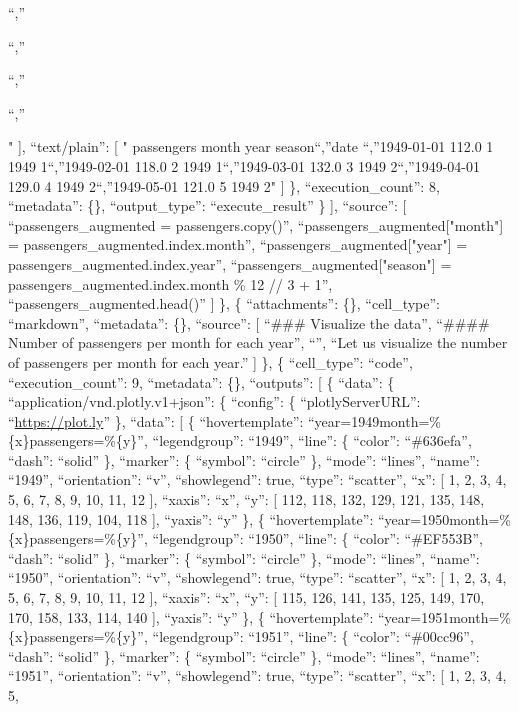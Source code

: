 \documentclass[
]{article}
\begin{document}
\n``,''

\n``,''

\n``,''

\n``,''

" {]}, ``text/plain'': {[} " passengers month year season\n``,''date
\n``,''1949-01-01 112.0 1 1949 1\n``,''1949-02-01 118.0 2 1949
1\n``,''1949-03-01 132.0 3 1949 2\n``,''1949-04-01 129.0 4 1949
2\n``,''1949-05-01 121.0 5 1949 2" {]} \}, ``execution\_count'': 8,
``metadata'': \{\}, ``output\_type'': ``execute\_result'' \} {]},
``source'': {[} ``passengers\_augmented = passengers.copy()\n'',
``passengers\_augmented{[}"month"{]} =
passengers\_augmented.index.month\n'',
``passengers\_augmented{[}"year"{]} =
passengers\_augmented.index.year\n'',
``passengers\_augmented{[}"season"{]} =
passengers\_augmented.index.month \% 12 // 3 + 1\n'',
``passengers\_augmented.head()'' {]} \}, \{ ``attachments'': \{\},
``cell\_type'': ``markdown'', ``metadata'': \{\}, ``source'': {[}
``\#\#\# Visualize the data\n'', ``\#\#\#\# Number of passengers per
month for each year\n'', ``\n'', ``Let us visualize the number of
passengers per month for each year.'' {]} \}, \{ ``cell\_type'':
``code'', ``execution\_count'': 9, ``metadata'': \{\}, ``outputs'': {[}
\{ ``data'': \{ ``application/vnd.plotly.v1+json'': \{ ``config'': \{
``plotlyServerURL'': ``\url{https://plot.ly}'' \}, ``data'': {[} \{
``hovertemplate'': ``year=1949month=\%\{x\}passengers=\%\{y\}'',
``legendgroup'': ``1949'', ``line'': \{ ``color'': ``\#636efa'',
``dash'': ``solid'' \}, ``marker'': \{ ``symbol'': ``circle'' \},
``mode'': ``lines'', ``name'': ``1949'', ``orientation'': ``v'',
``showlegend'': true, ``type'': ``scatter'', ``x'': {[} 1, 2, 3, 4, 5,
6, 7, 8, 9, 10, 11, 12 {]}, ``xaxis'': ``x'', ``y'': {[} 112, 118, 132,
129, 121, 135, 148, 148, 136, 119, 104, 118 {]}, ``yaxis'': ``y'' \}, \{
``hovertemplate'': ``year=1950month=\%\{x\}passengers=\%\{y\}'',
``legendgroup'': ``1950'', ``line'': \{ ``color'': ``\#EF553B'',
``dash'': ``solid'' \}, ``marker'': \{ ``symbol'': ``circle'' \},
``mode'': ``lines'', ``name'': ``1950'', ``orientation'': ``v'',
``showlegend'': true, ``type'': ``scatter'', ``x'': {[} 1, 2, 3, 4, 5,
6, 7, 8, 9, 10, 11, 12 {]}, ``xaxis'': ``x'', ``y'': {[} 115, 126, 141,
135, 125, 149, 170, 170, 158, 133, 114, 140 {]}, ``yaxis'': ``y'' \}, \{
``hovertemplate'': ``year=1951month=\%\{x\}passengers=\%\{y\}'',
``legendgroup'': ``1951'', ``line'': \{ ``color'': ``\#00cc96'',
``dash'': ``solid'' \}, ``marker'': \{ ``symbol'': ``circle'' \},
``mode'': ``lines'', ``name'': ``1951'', ``orientation'': ``v'',
``showlegend'': true, ``type'': ``scatter'', ``x'': {[} 1, 2, 3, 4, 5,
\end{document}
